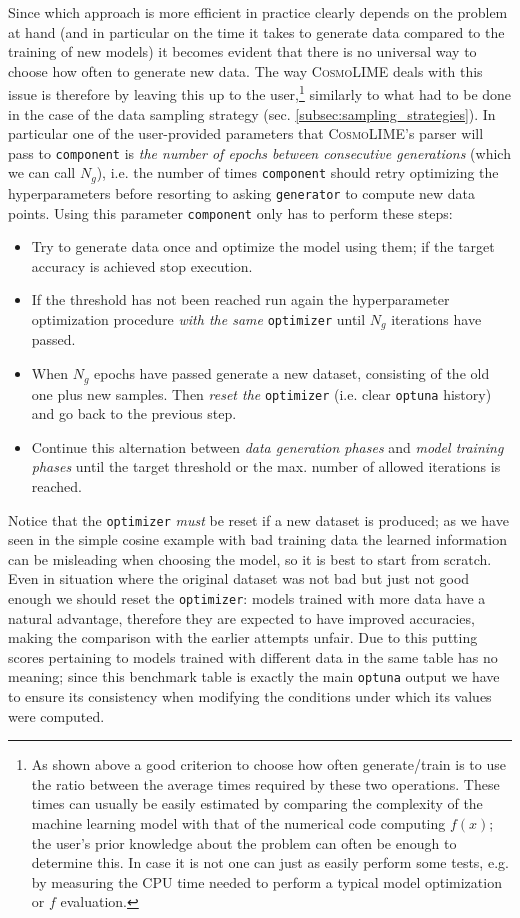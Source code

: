 Since which approach is more efficient in practice clearly depends on the problem at hand (and in particular on the time it takes to generate data compared to the training of new models) it becomes evident that there is no universal way to choose how often to generate new data. 
The way \textsc{CosmoLIME} deals with this issue is therefore by leaving this up to the user,\footnote{As shown above a good criterion to choose how often generate/train is to use the ratio between the average times required by these two operations. These times can usually be easily estimated by comparing the complexity of the machine learning model with that of the numerical code computing $f(x)$; the user's prior knowledge about the problem can often be enough to determine this. In case it is not one can just as easily perform some tests, e.g. by measuring the CPU time needed to perform a typical model optimization or $f$ evaluation.} similarly to what had to be done in the case of the data sampling strategy (sec. \ref{subsec:sampling_strategies}). In particular one of the user-provided parameters that \textsc{CosmoLIME}'s parser will pass to \texttt{component} is \emph{the number of epochs between consecutive generations} (which we can call $N_g$), i.e. the number of times \texttt{component} should retry optimizing the hyperparameters before resorting to asking \texttt{generator} to compute new data points. Using this parameter \texttt{component} only has to perform these steps:
\begin{itemize}
    \item Try to generate data once and optimize the model using them; if the target accuracy is achieved stop execution.
    \item If the threshold has not been reached run again the hyperparameter optimization procedure \emph{with the same} \texttt{optimizer} until $N_g$ iterations have passed.
    \item When $N_g$ epochs have passed generate a new dataset, consisting of the old one plus new samples. Then \emph{reset the} \texttt{optimizer} (i.e. clear \texttt{optuna} history) and go back to the previous step.
    \item Continue this alternation between \emph{data generation phases} and \emph{model training phases} until the target threshold or the max. number of allowed iterations is reached.
\end{itemize}
Notice that the \texttt{optimizer} \emph{must} be reset if a new dataset is produced; as we have seen in the simple cosine example with bad training data the learned information can be misleading when choosing the model, so it is best to start from scratch. Even in situation where the original dataset was not bad but just not good enough we should reset the \texttt{optimizer}: models trained with more data have a natural advantage, therefore they are expected to have improved accuracies, making the comparison with the earlier attempts unfair. Due to this putting scores pertaining to models trained with different data in the same table has no meaning; since this benchmark table is exactly the main \texttt{optuna} output we have to ensure its consistency when modifying the conditions under which its values were computed.


